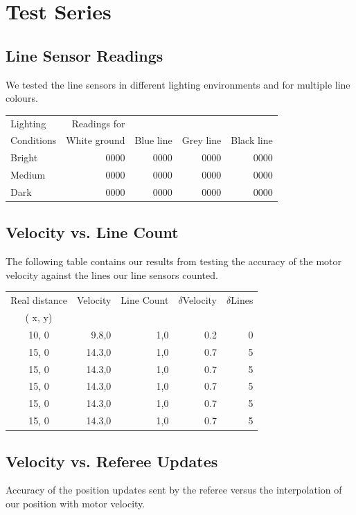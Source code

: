 \documentclass[12pt]{article}
\begin{document}
\lstset{language=C++}

\section*{Test Series}
\subsection*{Line Sensor Readings}
We tested the line sensors in different lighting environments and for multiple line colours.


\begin{tabular}{ | l | r | r | r | r | }
\hline
Lighting & Readings for & & & \\
Conditions & White ground & Blue line & Grey line & Black line \\ \hline
Bright & 0000 & 0000 & 0000 & 0000 \\ \hline
Medium & 0000 & 0000 & 0000 & 0000 \\ \hline
Dark & 0000 & 0000 & 0000 & 0000 \\
\hline
\end{tabular}

\subsection*{Velocity vs. Line Count}
The following table contains our results from testing the accuracy of the motor velocity against the lines our line sensors counted.


\begin{tabular}{ | c || r | r | r | r | }
\hline
Real distance & Velocity & Line Count & $\delta$Velocity & $\delta$Lines \\
 ( x, y) & & & & \\ \hline
10, 0 & 9.8,0 & 1,0 & 0.2 & 0 \\ \hline
15, 0 & 14.3,0 & 1,0 & 0.7 & 5 \\ \hline
15, 0 & 14.3,0 & 1,0 & 0.7 & 5 \\ \hline
15, 0 & 14.3,0 & 1,0 & 0.7 & 5 \\ \hline
15, 0 & 14.3,0 & 1,0 & 0.7 & 5 \\ \hline
15, 0 & 14.3,0 & 1,0 & 0.7 & 5 \\ \hline
\end{tabular}

\subsection*{Velocity vs. Referee Updates}
Accuracy of the position updates sent by the referee versus the interpolation of our position with motor velocity.
\end{document}
